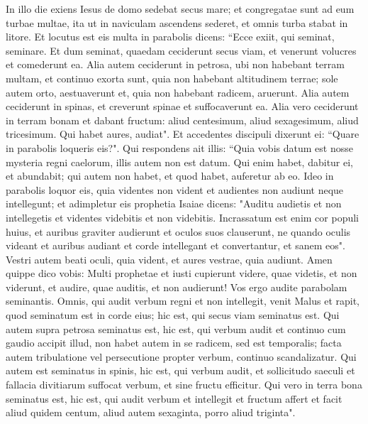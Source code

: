 \begin{biblechapter}  
\verse In illo die exiens Iesus de domo sedebat secus mare; 
\verse et congregatae sunt ad eum turbae multae, ita ut in naviculam ascendens sederet, et omnis turba stabat in litore. 
\verse Et locutus est eis multa in parabolis dicens: “Ecce exiit, qui seminat, seminare. 
\verse Et dum seminat, quaedam ceciderunt secus viam, et venerunt volucres et comederunt ea. 
\verse Alia autem ceciderunt in petrosa, ubi non habebant terram multam, et continuo exorta sunt, quia non habebant altitudinem terrae; 
\verse sole autem orto, aestuaverunt et, quia non habebant radicem, aruerunt. 
\verse Alia autem ceciderunt in spinas, et creverunt spinae et suffocaverunt ea. 
\verse Alia vero ceciderunt in terram bonam et dabant fructum: aliud centesimum, aliud sexagesimum, aliud tricesimum. 
\verse Qui habet aures, audiat". 
\verse Et accedentes discipuli dixerunt ei: “Quare in parabolis loqueris eis?". 
\verse Qui respondens ait illis: “Quia vobis datum est nosse mysteria regni caelorum, illis autem non est datum. 
\verse Qui enim habet, dabitur ei, et abundabit; qui autem non habet, et quod habet, auferetur ab eo.  
\verse Ideo in parabolis loquor eis, quia videntes non vident et audientes non audiunt neque intellegunt; 
\verse et adimpletur eis prophetia Isaiae dicens: "Auditu audietis et non intellegetis et videntes videbitis et non videbitis. 
\verse Incrassatum est enim cor populi huius, et auribus graviter audierunt et oculos suos clauserunt, ne quando oculis videant et auribus audiant et corde intellegant et convertantur, et sanem eos". 
\verse Vestri autem beati oculi, quia vident, et aures vestrae, quia audiunt. 
\verse Amen quippe dico vobis: Multi prophetae et iusti cupierunt videre, quae videtis, et non viderunt, et audire, quae auditis, et non audierunt! 
\verse Vos ergo audite parabolam seminantis. 
\verse Omnis, qui audit verbum regni et non intellegit, venit Malus et rapit, quod seminatum est in corde eius; hic est, qui secus viam seminatus est. 
\verse Qui autem supra petrosa seminatus est, hic est, qui verbum audit et continuo cum gaudio accipit illud, 
\verse non habet autem in se radicem, sed est temporalis; facta autem tribulatione vel persecutione propter verbum, continuo scandalizatur. 
\verse Qui autem est seminatus in spinis, hic est, qui verbum audit, et sollicitudo saeculi et fallacia divitiarum suffocat verbum, et sine fructu efficitur. 
\verse Qui vero in terra bona seminatus est, hic est, qui audit verbum et intellegit et fructum affert et facit aliud quidem centum, aliud autem sexaginta, porro aliud triginta". 

\end{biblechapter}
